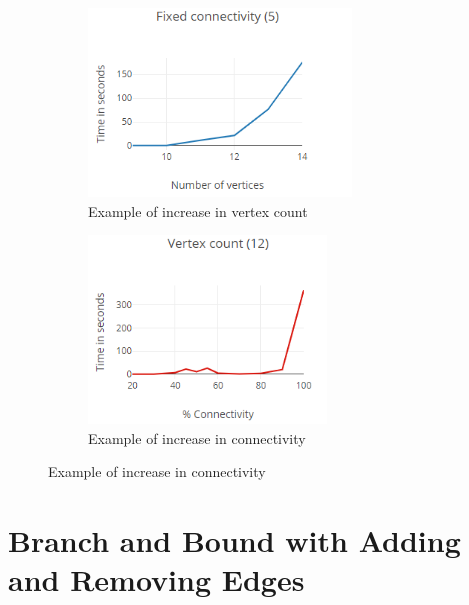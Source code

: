 \documentclass[11pt, english]{article}
\begin{document}
\begin{figure}[H]
\centering
\begin{subfigure}{.33\textwidth}
\includegraphics[height=5cm,valign=t]{fixed_connectivity.png}
\caption{Example of increase in vertex count}
\end{subfigure}%
\hfill
\begin{subfigure}{.33\textwidth}
\includegraphics[height=5cm,valign=t]{fixed_vertices.png}
\caption{Example of increase in connectivity}
\end{subfigure}%
\end{figure}

\section{Branch and Bound with Adding and Removing Edges}
\end{document}
